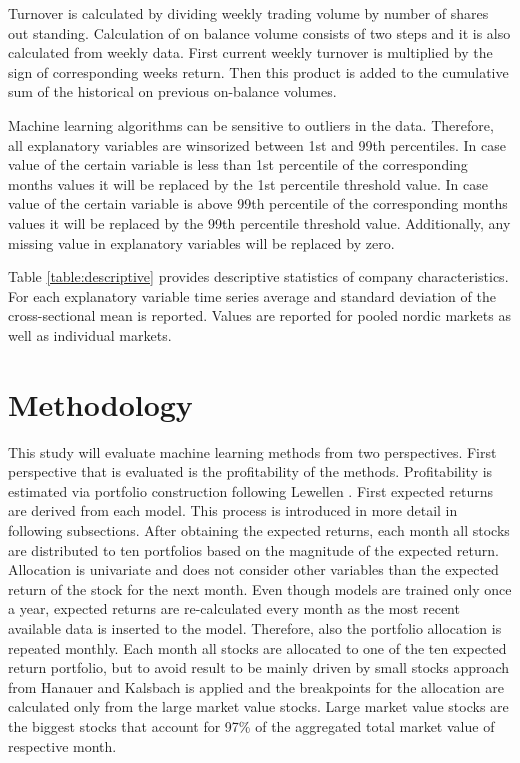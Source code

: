 \documentclass{article}
\begin{document}
Turnover is calculated by dividing weekly trading volume by number of shares out standing. Calculation of on balance volume consists of two steps and it is also calculated from weekly data. First current weekly turnover is multiplied by the sign of corresponding weeks return. Then this product is added to the cumulative sum of the historical on previous on-balance volumes.

Machine learning algorithms can be sensitive to outliers in the data. Therefore, all explanatory variables are winsorized between 1st and 99th percentiles. In case value of the certain variable is less than 1st percentile of the corresponding months values it will be replaced by the 1st percentile threshold value. In case value of the certain variable is above 99th percentile of the corresponding months values it will be replaced by the 99th percentile threshold value. %
Additionally, any missing value in explanatory variables will be replaced by zero.

Table \ref{table:descriptive} provides descriptive statistics of company characteristics. For each explanatory variable time series average and standard deviation of the cross-sectional mean is reported. Values are reported for pooled nordic markets as well as individual markets. %




\section{Methodology} \label{Methodology}

This study will evaluate machine learning methods from two perspectives. First perspective that is evaluated is the profitability of the methods. Profitability is estimated via portfolio construction following Lewellen \citeyear{lewellen2015}. First expected returns are derived from each model. This process is introduced in more detail in following subsections. After obtaining the expected returns, each month all stocks are distributed to ten portfolios based on the magnitude of the expected return. Allocation is univariate and does not consider other variables than the expected return of the stock for the next month. Even though models are trained only once a year, expected returns are re-calculated every month as the most recent available data is inserted to the model. Therefore, also the portfolio allocation is repeated monthly. Each month all stocks are allocated to one of the ten expected return portfolio, but to avoid result to be mainly driven by small stocks approach from Hanauer and Kalsbach is applied \citeyear{HANAUER2022}  and the breakpoints for the allocation are calculated only from the large market value stocks. Large market value stocks are the biggest stocks that account for 97\% of the aggregated total market value of respective month.
\end{document}
